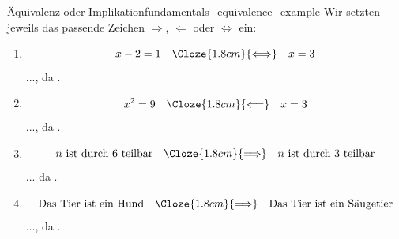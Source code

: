 \begin{ExampleBox}{Äquivalenz oder Implikation}{fundamentals_equivalence_example}
  Wir setzten jeweils das passende Zeichen $\Rightarrow$, $\Leftarrow$ oder $\Leftrightarrow$ ein:
  \begin{enumerate}[label=\alph*),itemsep=0.9em]
    \item \[
      x-2=1
      \quad\Cloze{1.8cm}{\Longleftrightarrow}\quad
      x=3
      \]
      ..., da .

    \item \[
      x^2=9
      \quad\Cloze{1.8cm}{\Longleftarrow}\quad
      x=3
      \]
      ..., da .

    \item \[
      n\text{ ist durch }6\text{ teilbar}
      \quad\Cloze{1.8cm}{\Longrightarrow}\quad
      n\text{ ist durch }3\text{ teilbar}
      \]
      ... da .

    \item \[
      \text{Das Tier ist ein Hund}
      \quad\Cloze{1.8cm}{\Longrightarrow}\quad
      \text{Das Tier ist ein Säugetier}
      \]
      ..., da .
  \end{enumerate}
\end{ExampleBox}
